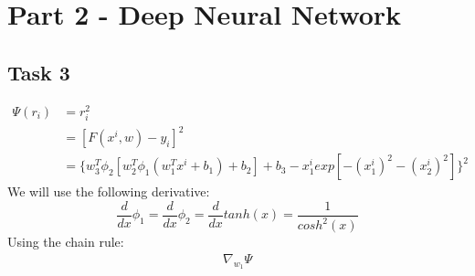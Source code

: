 \documentclass[12pt]{scrartcl}
\begin{document}
\section*{Part 2 - Deep Neural Network}
\subsection*{Task 3}
\begin{align*}
\Psi(r_i)&=r_i^2\\
&=[F(x^i,w)-y_i]^2\\
&=\{w_3^T\phi_2[w_2^T\phi_1(w_1^Tx^i+b_1)+b_2]+b_3 -x_1^i exp[-(x_1^i)^2-(x_2^i)^2]\}^2
\end{align*}
We will use the following derivative:
$$\frac{d}{dx}\phi_1=\frac{d}{dx}\phi_2=\frac{d}{dx}tanh(x)=
\frac{1}{cosh^2(x)}$$
Using the chain rule:
\begin{align*}
\nabla_{w_1}\Psi %
\end{align*}

\begin{center}
\end{center}
\end{document}
